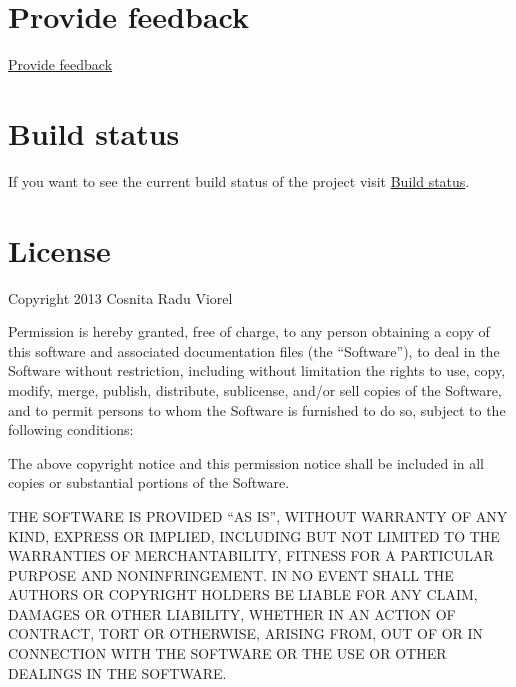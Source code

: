 \documentclass[letterpaper,10pt,english]{sphinxmanual}
\begin{document}
\chapter{Provide feedback}
\label{index:provide-feedback}
\href{https://docs.google.com/forms/d/1tKBopU3lfDB\_w8F4h7Rl1Rn4uydAJq-nha09L\_ptJck/edit?usp=sharing}{Provide feedback}


\chapter{Build status}
\label{index:build-status}
If you want to see the current build status of the project visit \href{http://jenkins.scrum-expert.ro:8080/job/fantastico-framework/badge/icon/}{Build status}.


\chapter{License}
\label{index:license}
Copyright 2013 Cosnita Radu Viorel

Permission is hereby granted, free of charge, to any person obtaining a copy of this software and associated
documentation files (the ``Software''), to deal in the Software without restriction, including without limitation
the rights to use, copy, modify, merge, publish, distribute, sublicense, and/or sell copies of the Software,
and to permit persons to whom the Software is furnished to do so, subject to the following conditions:

The above copyright notice and this permission notice shall be included in all copies or substantial portions of the Software.

THE SOFTWARE IS PROVIDED ``AS IS'', WITHOUT WARRANTY OF ANY KIND, EXPRESS OR IMPLIED, INCLUDING BUT NOT LIMITED TO THE
WARRANTIES OF MERCHANTABILITY, FITNESS FOR A PARTICULAR PURPOSE AND NONINFRINGEMENT. IN NO EVENT SHALL THE AUTHORS OR
COPYRIGHT HOLDERS BE LIABLE FOR ANY CLAIM, DAMAGES OR OTHER LIABILITY, WHETHER IN AN ACTION OF CONTRACT, TORT OR OTHERWISE,
ARISING FROM, OUT OF OR IN CONNECTION WITH THE SOFTWARE OR THE USE OR OTHER DEALINGS IN THE SOFTWARE.



\renewcommand{\indexname}{Index}
\printindex
\end{document}
